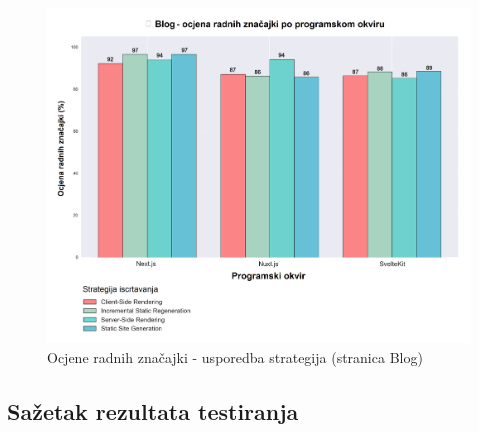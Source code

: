 \begin{figure}[H]
    \centering
    \includegraphics[width=\textwidth]{slike/rezultati/blog/blog_strategy_comparison.png}
    \caption{Ocjene radnih značajki - usporedba strategija (stranica Blog)}
    \label{fig:testiranje-blog-usporedba-strategija}
\end{figure}

\newpage

\subsection{Sažetak rezultata testiranja}

